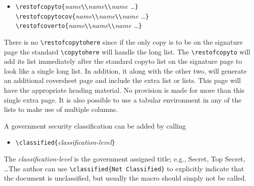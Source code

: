 \begin{itemize}
\item[]
\verb|\restofcopyto{|{\it name\/}\verb|\\|{\it name\/}\verb|\\|{\it name \dots}\verb|}|\\
\verb|\restofcopytocov{|{\it name\/}\verb|\\|{\it name\/}\verb|\\|{\it name \dots}\verb|}|\\
\verb|\restofcoverto{|{\it name\/}\verb|\\|{\it name\/}\verb|\\|{\it name \dots}\verb|}|
\end{itemize}

There is no \verb|\restofcopytohere| since if the only copy is to be
on the signature page the standard \verb|\copytohere| will handle the
long list.  The \verb|\restofcopyto| will add its list immediately
after the standard copyto list on the signature page to look like a
single long list.  In addition, it along with the other two, will
generate an additional coversheet page and include the extra list or
lists.  This page will have the appropriate heading material.  No
provision is made for more than this single extra page.  It is also
possible to use a tabular environment in any of the lists to make
use of multiple columns.

A government security classification can be added by calling
\begin{itemize}
\item[]
\verb|\classified{|{\it classification-level}\verb|}|
\end{itemize}
The {\it classification-level} is the government assigned title;
e.g., Secret, Top Secret, \dots  The author can use
\verb|\classified{Not Classified}| to explicitly indicate that the
document is unclassified, but usually the macro should simply not be
called.

